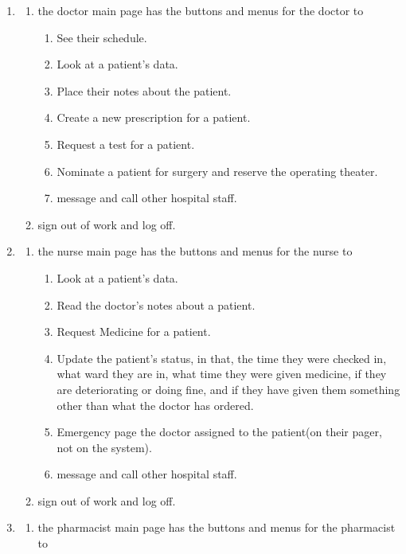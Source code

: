 \documentclass[14pt]{article}
\begin{document}
\begin{enumerate}
		\item \begin{enumerate}
			\item the doctor main page has the buttons and menus for the doctor to 
				\begin{enumerate}
					\item See their schedule.
					\item Look at a patient's data.
					\item Place their notes about the patient.
					\item Create a new prescription for a patient.
					\item Request a test for a patient.
					\item Nominate a patient for surgery and reserve the operating theater. 
					\item message and call other hospital staff.
				\end{enumerate}
			\item sign out of work and log off.
		  \end{enumerate}
		\item \begin{enumerate}
			\item the nurse main page has the buttons and menus for the nurse to 
				\begin{enumerate}
					\item Look at a patient's data.
					\item Read the doctor's notes about a patient.
					\item Request Medicine for a patient.
					\item Update the patient's status, in that, the time they were checked in, what ward they are in, what time
					they were given medicine, if they are deteriorating or doing fine, and if they have given them something other
					than what the doctor has ordered.
					\item Emergency page the doctor assigned to the patient(on their pager, not on the system).
					\item message and call other hospital staff.
				\end{enumerate}
			\item sign out of work and log off.
		  \end{enumerate}
	\item \begin{enumerate}
		\item the pharmacist main page has the buttons and menus for the pharmacist to 
				\begin{enumerate}

\end{enumerate}
\end{enumerate}
\end{enumerate}
\end{document}
